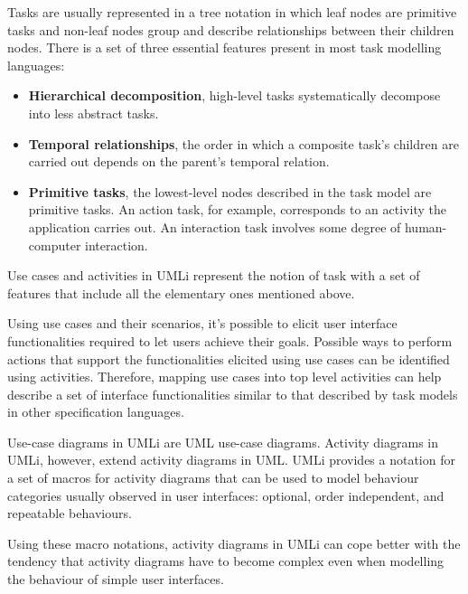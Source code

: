 Tasks are usually represented in a tree notation in which leaf nodes are primitive tasks and non-leaf nodes group and describe relationships between their children nodes. There is a set of three essential features present in most task modelling languages:
\begin{itemize}
\item \textbf{Hierarchical decomposition}, high-level tasks systematically decompose into less abstract tasks.

\item \textbf{Temporal relationships}, the order in which a composite task's children are carried out depends on the parent's temporal relation.

\item \textbf{Primitive tasks}, the lowest-level nodes described in the task model are primitive tasks. An action task, for example, corresponds to an activity the application carries out. An interaction task involves some degree of human-computer interaction.
\end{itemize}

Use cases and activities in UMLi represent the notion of task with a set of features that include all the elementary ones mentioned above.

Using use cases and their scenarios, it's possible to elicit user interface functionalities required to let users achieve their goals. Possible ways to perform actions that support the functionalities elicited using use cases can be identified using activities. Therefore, mapping use cases into top level activities can help describe a set of interface functionalities similar to that described by
task models in other specification languages.

Use-case diagrams in UMLi are UML use-case diagrams. Activity diagrams in UMLi, however, extend activity diagrams in UML. UMLi provides a notation for a set of macros for activity diagrams that can be used to model behaviour categories usually observed in user interfaces: optional, order independent, and repeatable behaviours.

Using these macro notations, activity diagrams in UMLi can cope better with the tendency that activity diagrams have to become complex even when modelling the behaviour of simple user interfaces.

